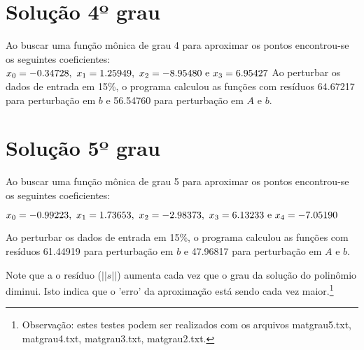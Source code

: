 \newpage
\section{Solução 4º grau}

Ao buscar uma função mônica de grau 4 para aproximar os pontos encontrou-se os seguintes 
coeficientes:
\(x_0 = -0.34728 ,~  x_1 = 1.25949,~ x_2 =  -8.95480 ~$e$~ x_3 = 6.95427 \)
%
Ao perturbar os dados de entrada em 15\%, o programa calculou as funções 
com resíduos 64.67217 para perturbação em $b$ e 56.54760  para perturbação em $A$ e $b$.

\newpage
\section{Solução 5º grau}

Ao buscar uma função mônica de grau 5 para aproximar os pontos encontrou-se os seguintes 
coeficientes:

\(x_0 = -0.99223,~    x_1 = 1.73653,~x_2 = -2.98373,~ x_3 = 6.13233 ~$e$~ x_4 =  -7.05190 \)

Ao perturbar os dados de entrada em 15\%, o programa calculou as funções 
com resíduos 61.44919  para perturbação em $b$ e 47.96817 para perturbação em $A$ e $b$.

Note que a o resíduo ($||s||$) aumenta cada vez que o grau da solução do polinômio diminui. Isto indica que o 'erro’ da aproximação está sendo cada vez maior.\footnote{Observação: estes testes podem ser realizados com os arquivos matgrau5.txt, matgrau4.txt, matgrau3.txt, matgrau2.txt.}

